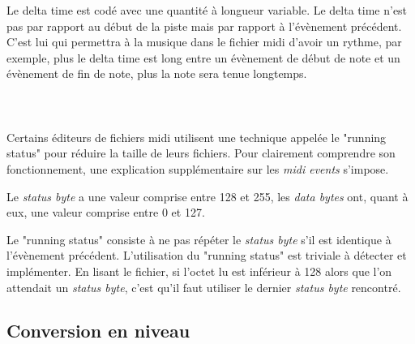Le delta time est codé avec une quantité à longueur variable. Le delta time n'est pas par rapport au début de la piste mais par rapport à l'évènement précédent. C'est lui qui permettra à la musique dans le fichier midi d'avoir un rythme, par exemple, plus le delta time est long entre un évènement de début de note et un évènement de fin de note, plus la note sera tenue longtemps.\\\\

\\\\

Certains éditeurs de fichiers midi utilisent une technique appelée le "running status" pour réduire la taille de leurs fichiers. Pour clairement comprendre son fonctionnement, une explication supplémentaire sur les \textit{midi events} s'impose.

Le \textit{status byte} a une valeur comprise entre 128 et 255, les \textit{data bytes} ont, quant à eux, une valeur comprise entre 0 et 127.

Le "running status" consiste à ne pas répéter le \textit{status byte} s'il est identique à l'évènement précédent. L'utilisation du "running status" est triviale à détecter et implémenter. En lisant le fichier, si l'octet lu est inférieur à 128 alors que l'on attendait un \textit{status byte}, c'est qu'il faut utiliser le dernier \textit{status byte} rencontré.

\subsection{Conversion en niveau}

